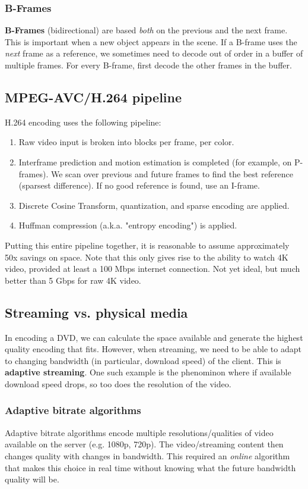 \documentclass[titlepage, 12pt, leqno]{article}
\begin{document}
\subsubsection{B-Frames}
\textbf{B-Frames} (bidirectional) are based \textit{both} on the previous and the
next frame. This is important when a new object appears in the scene.
If a B-frame uses the \textit{next} frame as a reference, we sometimes need to
decode out of order in a buffer of multiple frames. For every B-frame, first
decode the other frames in the buffer.

\subsection{MPEG-AVC/H.264 pipeline}
H.264 encoding uses the following pipeline:
\begin{enumerate}
    \item Raw video input is broken into blocks per frame, per color.
    \item Interframe prediction and motion estimation is completed (for example,
        on P-frames). We scan over previous and future frames to find the best
        reference (sparsest difference). If no good reference is found, use an
        I-frame.
    \item Discrete Cosine Transform, quantization, and sparse encoding are 
        applied.
    \item Huffman compression (a.k.a. "entropy encoding") is applied.
\end{enumerate}

Putting this entire pipeline together, it is reasonable to assume approximately
50x savings on space. Note that this only gives rise to the ability to watch 4K
video, provided at least a 100 Mbps internet connection. Not yet ideal, but much
better than 5 Gbps for raw 4K video.

\subsection{Streaming vs. physical media}
In encoding a DVD, we can calculate the space available and generate the highest
quality encoding that fits. However, when streaming, we need to be able to 
adapt to changing bandwidth (in particular, download speed) of the client. This
is \textbf{adaptive streaming}. One such example is the phenominon where if 
available download speed drops, so too does the resolution of the video.

\subsubsection{Adaptive bitrate algorithms}
Adaptive bitrate algorithms encode multiple resolutions/qualities of video
available on the server (e.g. 1080p, 720p). The video/streaming content then 
changes quality with changes in bandwidth. This required an \textit{online}
algorithm that makes this choice in real time without knowing what the future
bandwidth quality will be.
\end{document}
